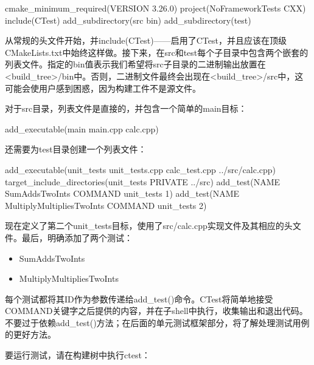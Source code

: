 \begin{cmake}
cmake_minimum_required(VERSION 3.26.0)
project(NoFrameworkTests CXX)
include(CTest)
add_subdirectory(src bin)
add_subdirectory(test)
\end{cmake}

从常规的头文件开始，并include(CTest)——启用了CTest，并且应该在顶级CMakeLists.txt中始终这样做。接下来，在src和test每个子目录中包含两个嵌套的列表文件。指定的bin值表示我们希望将src子目录的二进制输出放置在<build\_tree>/bin中。否则，二进制文件最终会出现在<build\_tree>/src中，这可能会使用户感到困惑，因为构建工件不是源文件。

对于src目录，列表文件是直接的，并包含一个简单的main目标：


\begin{cmake}
add_executable(main main.cpp calc.cpp)
\end{cmake}

还需要为test目录创建一个列表文件：


\begin{cmake}
add_executable(unit_tests
               unit_tests.cpp
               calc_test.cpp
               ../src/calc.cpp)
target_include_directories(unit_tests PRIVATE ../src)
add_test(NAME SumAddsTwoInts COMMAND unit_tests 1)
add_test(NAME MultiplyMultipliesTwoInts COMMAND unit_tests 2)
\end{cmake}

现在定义了第二个unit\_tests目标，使用了src/calc.cpp实现文件及其相应的头文件。最后，明确添加了两个测试：

\begin{itemize}
\item
SumAddsTwoInts

\item
MultiplyMultipliesTwoInts
\end{itemize}

每个测试都将其ID作为参数传递给add\_test()命令。CTest将简单地接受COMMAND关键字之后提供的内容，并在子shell中执行，收集输出和退出代码。不要过于依赖add\_test()方法；在后面的单元测试框架部分，将了解处理测试用例的更好方法。

要运行测试，请在构建树中执行ctest：


